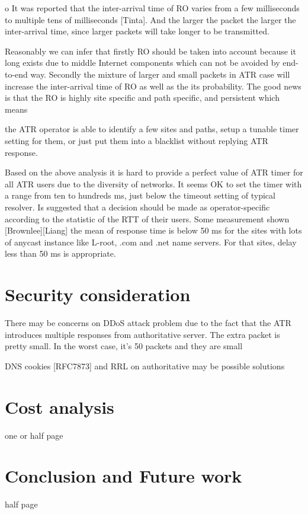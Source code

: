 o  It was reported that the inter-arrival time of RO varies from a
   few milliseconds to multiple tens of milliseconds [Tinta].  And
   the larger the packet the larger the inter-arrival time, since
   larger packets will take longer to be transmitted.

Reasonably we can infer that firstly RO should be taken into account
because it long exists due to middle Internet components which can
not be avoided by end-to-end way.  Secondly the mixture of larger and
small packets in ATR case will increase the inter-arrival time of RO
as well as the its probability.  The good news is that the RO is
highly site specific and path specific, and persistent which means

the ATR operator is able to identify a few sites and paths, setup a
tunable timer setting for them, or just put them into a blacklist
without replying ATR response.

Based on the above analysis it is hard to provide a perfect value of
ATR timer for all ATR users due to the diversity of networks.  It
seems OK to set the timer with a range from ten to hundreds ms, just
below the timeout setting of typical resolver.  Is suggested that a
decision should be made as operator-specific according to the
statistic of the RTT of their users.  Some measurement shown
[Brownlee][Liang] the mean of response time is below 50 ms for the
sites with lots of anycast instance like L-root, .com and .net name
servers.  For that sites, delay less than 50 ms is appropriate.


\section{Security consideration}


There may be concerns on DDoS attack problem due to the fact that the
ATR introduces multiple responses from authoritative server.  The
extra packet is pretty small.  In the worst case, it's 50%
packets and they are small

DNS cookies [RFC7873] and RRL on authoritative may be possible
solutions


\section{Cost analysis}
one or half page

\section{Conclusion and Future work}

half page 
